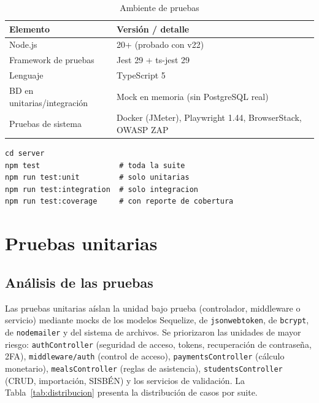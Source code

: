 \documentclass[stu,11pt,floatsintext]{apa7}
\begin{document}
\begin{table}[H]
\centering
\caption{Ambiente de pruebas}
\label{tab:ambiente}
\begin{tabularx}{\textwidth}{L{0.34\textwidth} X}
\toprule
\textbf{Elemento} & \textbf{Versión / detalle} \\
\midrule
Node.js & 20+ (probado con v22) \\
Framework de pruebas & Jest 29 + ts-jest 29 \\
Lenguaje & TypeScript 5 \\
BD en unitarias/integración & Mock en memoria (sin PostgreSQL real) \\
Pruebas de sistema & Docker (JMeter), Playwright 1.44, BrowserStack, OWASP ZAP \\
\bottomrule
\end{tabularx}
\end{table}

\begin{lstlisting}[caption={Scripts de ejecución (backend)},captionpos=b]
cd server
npm test                  # toda la suite
npm run test:unit         # solo unitarias
npm run test:integration  # solo integracion
npm run test:coverage     # con reporte de cobertura
\end{lstlisting}

\section{Pruebas unitarias}

\subsection{Análisis de las pruebas}
Las pruebas unitarias aíslan la unidad bajo prueba (controlador, middleware o servicio)
mediante mocks de los modelos Sequelize, de \texttt{jsonwebtoken}, de \texttt{bcrypt}, de
\texttt{nodemailer} y del sistema de archivos. Se priorizaron las unidades de mayor
riesgo: \texttt{authController} (seguridad de acceso, tokens, recuperación de contraseña,
2FA), \texttt{middleware/auth} (control de acceso), \texttt{paymentsController} (cálculo
monetario), \texttt{mealsController} (reglas de asistencia), \texttt{studentsController}
(CRUD, importación, SISBÉN) y los servicios de validación. La
Tabla~\ref{tab:distribucion} presenta la distribución de casos por suite.
\end{document}
